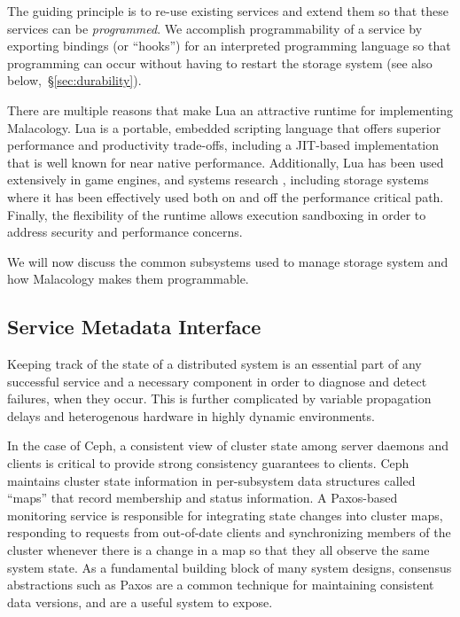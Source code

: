\documentclass[preprint]{sigplanconf-eurosys}
\begin{document}
The guiding principle
is to re-use existing services and extend them so that these services can be
\emph{programmed}. We accomplish programmability of a service by exporting
bindings (or ``hooks'') for an interpreted programming language so that
programming can occur without having to restart the storage system (see also
below,~\S\ref{sec:durability}). 

There are multiple reasons that make Lua an attractive runtime for implementing
Malacology. Lua is a portable, embedded scripting language that offers superior
performance and productivity trade-offs, including a JIT-based implementation
that is well known for near native performance. Additionally, Lua has been used
extensively in game engines, and systems research \cite{neto:dls14-luaos},
including storage systems where it has been effectively used both on
\cite{grawinkel:pdsw2012-lua,watkins2013:bdmc13-in-vivo,geambasu_comet_2010}
and off \cite{sevilla:sc15-mantle} the performance critical path. Finally, the
flexibility of the runtime allows execution sandboxing in order to address
security and performance concerns.

We will now discuss the common subsystems used to manage storage system and how
Malacology makes them programmable.

\subsection{Service Metadata Interface}
\label{sec:mon}
\label{service-metadata}

Keeping track of the state of a distributed system is an essential part of any
successful service and a necessary component in order to diagnose and detect
failures, when they occur. This is further complicated by variable propagation
delays and heterogenous hardware in highly dynamic environments.

In the case of Ceph, a consistent view of cluster state among server daemons
and clients is critical to provide strong consistency guarantees to clients.
Ceph maintains cluster state information in per-subsystem data structures
called ``maps'' that record membership and status information.  A Paxos-based
monitoring service is responsible for integrating state changes into cluster
maps, responding to requests from out-of-date clients and synchronizing members
of the cluster whenever there is a change in a map so that they all observe the
same system state. As a fundamental building block of many system designs,
consensus abstractions such as Paxos are a common technique for maintaining
consistent data versions, and are a useful system to expose.
\end{document}
